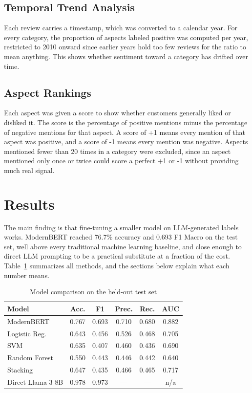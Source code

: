 \documentclass[sigconf]{acmart}
\begin{document}
\subsection{Temporal Trend Analysis}
Each review carries a timestamp, which was converted to a calendar year. For every category, the proportion of aspects labeled positive was computed per year, restricted to 2010 onward since earlier years hold too few reviews for the ratio to mean anything. This shows whether sentiment toward a category has drifted over time.

\subsection{Aspect Rankings}
\label{sec:aspect-scoring}
Each aspect was given a score to show whether customers generally liked or disliked it. The score is the percentage of positive mentions minus the percentage of negative mentions for that aspect. A score of +1 means every mention of that aspect was positive, and a score of -1 means every mention was negative. Aspects mentioned fewer than 20 times in a category were excluded, since an aspect mentioned only once or twice could score a perfect +1 or -1 without providing much real signal.

\section{Results}
\label{sec:results}

The main finding is that fine-tuning a smaller model on LLM-generated labels works. ModernBERT reached 76.7\% accuracy and 0.693 F1 Macro on the test set, well above every traditional machine learning baseline, and close enough to direct LLM prompting to be a practical substitute at a fraction of the cost. Table~\ref{tab:results} summarizes all methods, and the sections below explain what each number means.

\begin{table}[h]
\centering
\small
\setlength{\tabcolsep}{3pt}
\caption{Model comparison on the held-out test set}
\label{tab:results}
\begin{tabular}{lccccc}
\toprule
\textbf{Model} & \textbf{Acc.} & \textbf{F1} & \textbf{Prec.} & \textbf{Rec.} & \textbf{AUC} \\
\midrule
ModernBERT & 0.767 & 0.693 & 0.710 & 0.680 & 0.882 \\
Logistic Reg. & 0.643 & 0.456 & 0.526 & 0.468 & 0.705 \\
SVM & 0.635 & 0.407 & 0.460 & 0.436 & 0.690 \\
Random Forest & 0.550 & 0.443 & 0.446 & 0.442 & 0.640 \\
Stacking & 0.647 & 0.435 & 0.466 & 0.465 & 0.717 \\
Direct Llama 3 8B & 0.978 & 0.973 & --- & --- & n/a \\
\bottomrule
\end{tabular}
\end{table}
\end{document}
